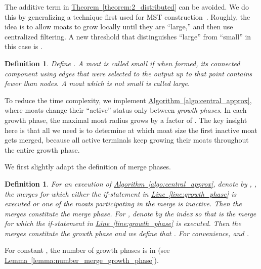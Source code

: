 \documentclass[letterpaper,11pt]{article}
\newtheorem{definition}[theorem]{Definition}
\newcommand{\namedref}[2]{\hyperref[#2]{#1~\ref*{#2}}}
\newcommand{\theoremref}[1]{\namedref{Theorem}{#1}}
\newcommand{\lemmaref}[1]{\namedref{Lemma}{#1}}
\newcommand{\algref}[1]{\namedref{Algorithm}{#1}}
\newcommand{\lineref}[1]{\namedref{Line}{#1}}
\begin{document}
The additive  term in \theoremref{theorem:2_distributed} can be
avoided. We do this by generalizing a technique first used for MST 
construction~\cite{GarayKP-98,KuttenP-98}. 
Roughly, the idea is to allow moats to grow locally until
they are ``large,'' and then use centralized filtering. A new
threshold that distinguishes ``large'' from ``small'' in this case is .




\begin{definition}Define . A moat is called \emph{small} if when
formed, its connected component using edges that were selected to the output up
to that point contains fewer than  nodes. A moat which is not small
is called \emph{large}.
\end{definition}



To reduce the time complexity, we implement
\algref{algo:central_approx}, where moats change
their ``active'' status only between \emph{growth phases}. In each growth phase,
the maximal moat radius grows by a factor of . The key insight here is that all we need is to determine at which
moat size the first inactive moat gets merged, because all active terminals
keep growing their moats throughout the
entire growth phase. 

We first slightly
adapt the definition of merge phases.

\begin{definition}For an execution of \algref{algo:central_approx}, denote by ,
, the merges for which either the if-statement in
\lineref{line:growth_phase} is executed or one of the moats participating in the
merge is inactive. Then the merges  constitute the
\emph{ merge phase}. For , denote by  the
index so that  is the  merge for which the if-statement in
\lineref{line:growth_phase} is executed. Then the merges
 constitute the \emph{ growth phase} and
we define that . For convenience,  and
.
\end{definition}

For constant , the number of growth phases is in
 (see \lemmaref{lemma:number_merge_growth_phase}).
\end{document}
